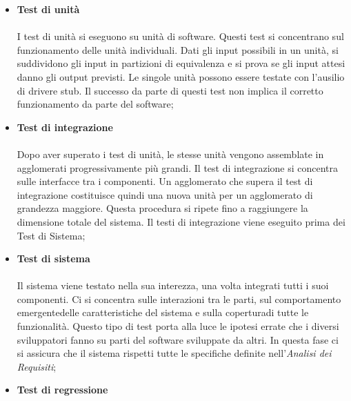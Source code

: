 		 \newline \newline
		\begin{itemize}
			\item \textbf{Test di unità} \mbox{}\\ \mbox{}\\
			I test di unità si eseguono su unità di software. Questi test si concentrano sul funzionamento delle unità individuali. Dati gli input possibili in un unità, si suddividono gli input in partizioni di equivalenza e si prova se gli input attesi danno gli output previsti. Le singole unità possono essere testate con l'ausilio di driver\glosp e stub\glo. Il successo da parte di questi test non implica il corretto funzionamento da parte del software; \newline \newline
			\item \textbf{Test di integrazione} \mbox{}\\ \mbox{}\\
			Dopo aver superato i test di unità, le stesse unità vengono assemblate in agglomerati progressivamente più grandi. Il test di integrazione si concentra sulle interfacce tra i componenti. Un agglomerato che supera il test di integrazione costituisce quindi una nuova unità per un agglomerato di grandezza maggiore. Questa procedura si ripete fino a raggiungere la dimensione totale del sistema. Il testi di integrazione viene eseguito prima dei Test di Sistema; \newline \newline
			\item \textbf{Test di sistema} \mbox{}\\ \mbox{}\\
			Il sistema viene testato nella sua interezza, una volta integrati tutti i suoi componenti. Ci si concentra sulle interazioni tra le parti, sul comportamento emergente\glosp delle caratteristiche del sistema e sulla copertura\glosp di tutte le funzionalità. Questo tipo di test porta alla luce le ipotesi errate che i diversi sviluppatori fanno su parti del software sviluppate da altri. 
			In questa fase ci si assicura che il sistema rispetti tutte le specifiche definite nell'\textit{Analisi dei Requisiti}; \newline \newline
			\item \textbf{Test di regressione} \mbox{}\\ \mbox{}\\

\end{itemize}
